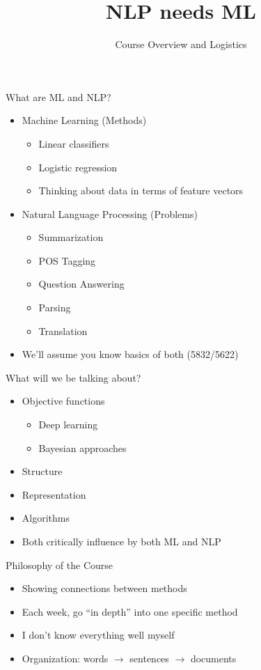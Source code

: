 \documentclass[compress]{beamer}
\title{NLP needs ML}
\date{Course Overview and Logistics}
\begin{document}
\frame{
\titlepage
}


\begin{frame}{What are ML and NLP?}

\begin{itemize}
\item Machine Learning (Methods)
\begin{itemize}
  \item Linear classifiers
  \item Logistic regression
  \item Thinking about data in terms of feature vectors
\end{itemize}
\item Natural Language Processing (Problems)
\begin{itemize}
  \item Summarization
  \item POS Tagging
  \item Question Answering
  \item Parsing
  \item Translation
\end{itemize}
\pause
\item We'll assume you know basics of both (5832/5622)
\end{itemize}
\end{frame}

\begin{frame}{What will we be talking about?}

\begin{itemize}
\item Objective functions
\begin{itemize}
\item Deep learning
\item Bayesian approaches
\end{itemize}
\item Structure
\item Representation
\item Algorithms
\pause
\item Both critically influence by both ML and NLP
\end{itemize}
\end{frame}


\begin{frame}{Philosophy of the Course}

  \begin{itemize}
    \item Showing connections between methods
    \item Each week, go ``in depth'' into one specific method
    \item I don't know everything well myself
    \item Organization: words $\rightarrow$ sentences $\rightarrow$ documents
  \end{itemize}

\end{frame}
\end{document}
